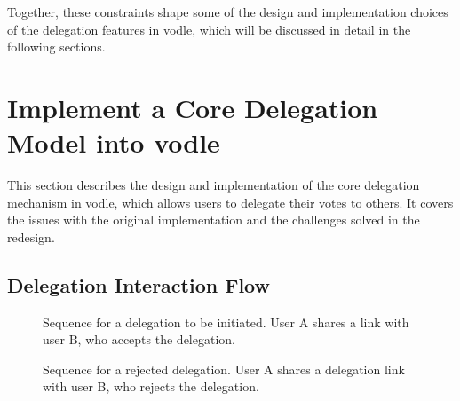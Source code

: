 Together, these constraints shape some of the design and implementation choices of the delegation features in vodle, which will be discussed in detail in the following sections.

\section{Implement a Core Delegation Model into vodle}
\label{sec:core_delegation_detailed}
This section describes the design and implementation of the core delegation mechanism in vodle, which allows users to delegate their votes to others. It covers the issues with the original implementation and the challenges solved in the redesign.

\subsection{Delegation Interaction Flow}


\begin{figure}[H]
  \centering
  \caption{Sequence for a delegation to be initiated. User A shares a link with user B, who accepts the delegation.}
  \label{fig:delegation-flow-accept}
\end{figure}

\begin{figure}[H]
  \centering
  \caption{Sequence for a rejected delegation. User A shares a delegation link with user B, who rejects the delegation.}
  \label{fig:delegation-flow-reject}
\end{figure}

